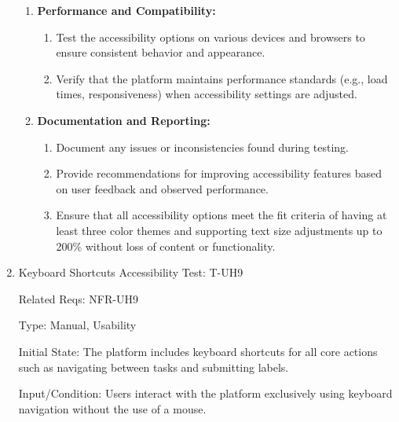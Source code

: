 \documentclass[12pt, titlepage]{article}
\begin{document}
\begin{enumerate}
\begin{enumerate}
    \item \textbf{Performance and Compatibility:}
    \begin{enumerate}
        \item Test the accessibility options on various devices and browsers to ensure consistent behavior and appearance.
        \item Verify that the platform maintains performance standards (e.g., load times, responsiveness) when accessibility settings are adjusted.
    \end{enumerate}
    \item \textbf{Documentation and Reporting:}
    \begin{enumerate}
        \item Document any issues or inconsistencies found during testing.
        \item Provide recommendations for improving accessibility features based on user feedback and observed performance.
        \item Ensure that all accessibility options meet the fit criteria of having at least three color themes and supporting text size adjustments up to 200\% without loss of content or functionality.
    \end{enumerate}
\end{enumerate}

\item{Keyboard Shortcuts Accessibility Test: T-UH9\\}

Related Reqs: NFR-UH9

Type: Manual, Usability

Initial State: The platform includes keyboard shortcuts for all core actions such as navigating between tasks and submitting labels.

Input/Condition: Users interact with the platform exclusively using keyboard navigation without the use of a mouse.


\end{enumerate}
\end{document}

